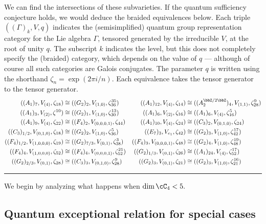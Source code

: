 \documentclass[12pt]{amsart}
\begin{document}
We can find the intersections of these subvarieties. If the quantum sufficiency conjecture holds, we would deduce the  braided equivalences below. Each triple $((\Gamma)_k,V,q)$ indicates the (semisimplified) quantum group representation  category for the Lie algebra $\Gamma$, tensored generated by the irreducible $V$, at the root of unity $q$. The subscript $k$ indicates the level, but this does not completely specify the (braided) category, which depends on the value of $q$ --- although of course all such categories are Galois conjugates. The parameter $q$ is written using the shorthand $\zeta_n = \exp(2 \pi i/n)$. Each equivalence takes the tensor generator to the tensor generator.
\begin{align*}
((A_1)_7,V_{(4)},\zeta_{18}) & \cong ((G_2)_2,V_{(1,0)},\zeta_{36}^{35}) &
((A_1)_{12},V_{(4)},\zeta_{14}) & \cong ((A_2^{\bbZ/2\bbZ})_4,V_{(1,1)},\zeta_{28}^9) \\
((A_1)_3,V_{(2)},\zeta^{10}) & \cong ((G_2)_1,V_{(1,0)},\zeta_{30}^{13}) &
((A_1)_6,V_{(2)},\zeta_{16}) & \cong ((A_1)_6,V_{(4)},\zeta_{16}^5) \\
((A_1)_9,V_{(4)},\zeta_{22}) & \cong ((F_4)_2,V_{(0,0,0,1)},\zeta_{44}) &
((A_1)_{10},V_{(4)},\zeta_{24}) & \cong ((C_3)_2,V_{(0,1,0)},\zeta_{24}) \\
((C_3)_{1/2},V_{(0,1,0)},\zeta_{18}) & \cong ((G_2)_{2},V_{(1,0)},\zeta_{36}^5) &
((E_7)_{3},V_{e_1},\zeta_{42}) & \cong ((G_2)_3,V_{(1,0)},\zeta_{42}^{17}) \\
((F_4)_{1/2},V_{(1,0,0,0)},\zeta_{19}) & \cong ((G_2)_{7/3},V_{(0,1)},\zeta_{38}^3) &
((F_4)_{3},V_{(0,0,0,1)},\zeta_{48}) & \cong ((G_2)_4,V_{(1,0)},\zeta_{48}^{19}) \\
((F_4)_{4},V_{(1,0,0,0)},\zeta_{52}) & \cong ((F_4)_4,V_{(0,0,0,1)},\zeta_{52}^{21}) &
((G_2)_{1/3},V_{(0,1)},\zeta_{26}) & \cong ((A_1)_{24},V_{(4)},\zeta_{52}^{17}) \\
((G_2)_{2/3},V_{(0,1)},\zeta_{28}) & \cong ((C_3)_{3},V_{(0,1,0)},\zeta_{28}^9) &
((G_2)_{3},V_{(0,1)},\zeta_{21}) & \cong ((G_2)_3,V_{(1,0)},\zeta_{21}^{16}) \\
\end{align*}


\hrule

We begin by analyzing what happens when $\dim \cC_4 < 5.$


\subsection{Quantum exceptional relation for special cases}
\end{document}
